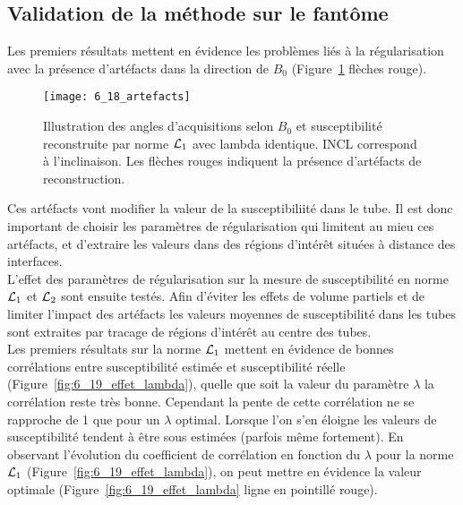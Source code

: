 {\subsection{Validation de la méthode sur le fantôme}
Les premiers résultats mettent en évidence les problèmes liés à la régularisation avec la
présence d’artéfacts dans la direction de $B_0$ (Figure~\ref{fig:6_18_artefacts} flèches rouge). 
\begin{figure}[!t]
\centering
\texttt{[image: 6\_18\_artefacts]}
\caption{Illustration des angles d'acquisitions selon $B_0$ et susceptibilité reconstruite par norme ${\cal L}_1$ avec lambda
identique. INCL correspond à l’inclinaison. Les flèches rouges indiquent la présence d’artéfacts de reconstruction.}
\label{fig:6_18_artefacts}	
\end{figure}
Ces artéfacts vont modifier la
valeur de la susceptibiliité dans le tube. Il est donc important de choisir les paramètres de
régularisation qui limitent au mieu ces artéfacts, et d’extraire les valeurs dans des régions d’intérêt
situées à distance des interfaces.\\
L’effet des paramètres de régularisation sur la mesure de susceptibilité en norme ${\cal L}_1$ et ${\cal L}_2$ sont
ensuite testés. Afin d’éviter les effets de volume partiels et de limiter l’impact des artéfacts les valeurs
moyennes de susceptibilité dans les tubes sont extraites par tracage de régions d’intérêt au centre des
tubes.\\

Les premiers résultats sur la norme ${\cal L}_1$ mettent en évidence de bonnes corrélations entre
susceptibilité estimée et susceptibilité réelle (Figure~\ref{fig:6_19_effet_lambda}), quelle que soit la valeur du paramètre $\lambda$ la
corrélation reste très bonne. Cependant la pente de cette corrélation ne se rapproche de 1 que pour
un $\lambda$ optimal. Lorsque l’on s’en éloigne les valeurs de susceptibilité tendent à être sous estimées
(parfois même fortement). En observant l’évolution du coefficient de corrélation en fonction du $\lambda$ pour
la norme ${\cal L}_1$ (Figure~\ref{fig:6_19_effet_lambda}), on peut mettre en évidence la valeur optimale (Figure~\ref{fig:6_19_effet_lambda} ligne en pointillé
rouge). 


}
